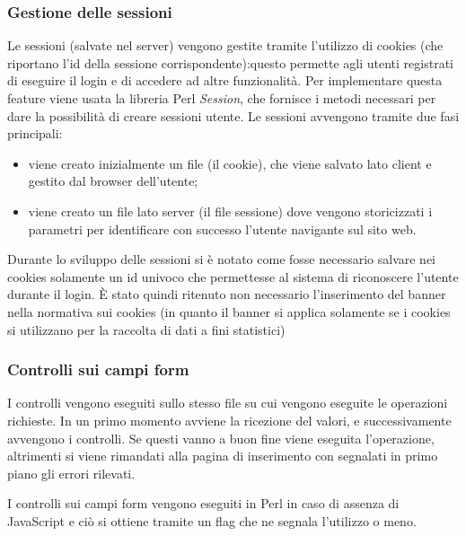 \subsubsection{Gestione delle sessioni}
Le sessioni (salvate nel server) vengono gestite tramite l'utilizzo di cookies (che riportano l'id della sessione corrispondente):questo permette agli utenti registrati di eseguire il login e di accedere ad altre funzionalit\`a.
Per implementare questa feature viene usata la libreria Perl \textit{Session}, che fornisce i metodi necessari per dare la possibilit\`a di creare sessioni utente. Le sessioni avvengono tramite due fasi principali:
\begin{itemize}

    \item viene creato inizialmente un file (il cookie), che viene salvato lato client e gestito dal browser dell'utente;
    \item viene creato un file lato server (il file sessione) dove vengono storicizzati i parametri per identificare con successo l'utente navigante sul sito web.

\end{itemize}

Durante lo sviluppo delle sessioni si \`e notato come fosse necessario salvare nei cookies solamente un id univoco che permettesse al sistema di riconoscere l'utente durante il login. \`E stato quindi ritenuto non necessario l'inserimento del banner nella normativa sui cookies (in quanto il banner si applica solamente se i cookies si utilizzano per la raccolta di dati a fini statistici)

\subsubsection{Controlli sui campi form}
I controlli vengono eseguiti sullo stesso file su cui vengono eseguite le operazioni richieste. In un primo momento avviene la ricezione del valori, e successivamente avvengono i controlli. Se questi vanno a buon fine viene eseguita l'operazione, altrimenti si viene rimandati alla pagina di inserimento con segnalati in primo piano gli errori rilevati.

I controlli sui campi form vengono eseguiti in Perl in caso di assenza di JavaScript e ci\`o si ottiene tramite un flag che ne segnala l'utilizzo o meno.
